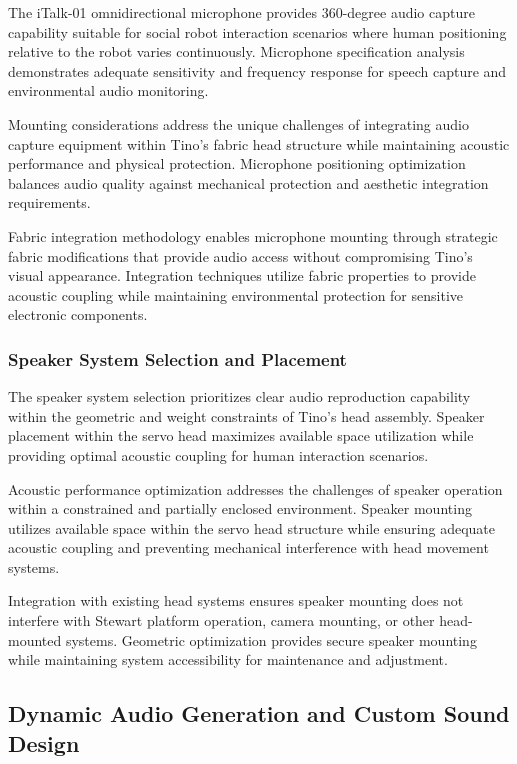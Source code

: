 The iTalk-01 omnidirectional microphone provides 360-degree audio capture capability suitable for social robot interaction scenarios where human positioning relative to the robot varies continuously. Microphone specification analysis demonstrates adequate sensitivity and frequency response for speech capture and environmental audio monitoring.

Mounting considerations address the unique challenges of integrating audio capture equipment within Tino's fabric head structure while maintaining acoustic performance and physical protection. Microphone positioning optimization balances audio quality against mechanical protection and aesthetic integration requirements.

Fabric integration methodology enables microphone mounting through strategic fabric modifications that provide audio access without compromising Tino's visual appearance. Integration techniques utilize fabric properties to provide acoustic coupling while maintaining environmental protection for sensitive electronic components.

\subsubsection{Speaker System Selection and Placement}

The speaker system selection prioritizes clear audio reproduction capability within the geometric and weight constraints of Tino's head assembly. Speaker placement within the servo head maximizes available space utilization while providing optimal acoustic coupling for human interaction scenarios.

Acoustic performance optimization addresses the challenges of speaker operation within a constrained and partially enclosed environment. Speaker mounting utilizes available space within the servo head structure while ensuring adequate acoustic coupling and preventing mechanical interference with head movement systems.

Integration with existing head systems ensures speaker mounting does not interfere with Stewart platform operation, camera mounting, or other head-mounted systems. Geometric optimization provides secure speaker mounting while maintaining system accessibility for maintenance and adjustment.

\subsection{Dynamic Audio Generation and Custom Sound Design}

